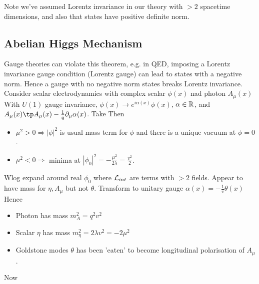 \documentclass{article}
\begin{document}
Note we've assumed Lorentz invariance in our theory with $>2$ spacetime dimensions, and also that states have positive definite norm. 

\subsection{Abelian Higgs Mechanism}
Gauge theories can violate this theorem, e.g. in QED, imposing a Lorentz invariance gauge condition (Lorentz gauge) can lead to states with a negative norm. Hence a gauge with no negative norm states breaks Lorentz invariance. \\

Consider scalar electrodynamics with complex scalar $\phi(x)$ nad photon $A_\mu(x)$ 
With $U(1)$ gauge invariance, $\phi(x) \to e^{i\alpha(x)}\phi(x)$, $\alpha\in\mathbb{R}$, and $A_\mu(x) \tp A_\mu(x) - \frac{1}{q} \del_\mu \alpha(x)$. Take 
Then 

\begin{itemize}
    \item $\mu^2 > 0 \Rightarrow |\phi|^2$ is usual mass term for $\phi$ and there is a unique vacuum at $\phi=0$. 
    \item $\mu^2 < 0 \Rightarrow $ minima at $|\phi_0|^2=-\frac{\mu^2}{2\lambda} = \frac{v^2}{2}$. 
\end{itemize}
Wlog expand around real $\phi_0$ 
where $\mathcal{L}_{int}$ are terms with $>2$ fields. Appear to have mass for $\eta,A_\mu$ but not $\theta$. Transform to unitary gauge $\alpha(x) = -\frac{1}{v} \theta(x) $
Hence 
\begin{itemize}
    \item Photon has mass $m_A^2 = q^2 v^2$ 
    \item Scalar $\eta$ has mass $m_\eta^2 = 2\lambda v^2 = -2\mu^2$ 
    \item Goldstone modes $\theta$ has been 'eaten' to become longitudinal polarisation of $A_\mu$. 
\end{itemize}
Now 
\end{document}
